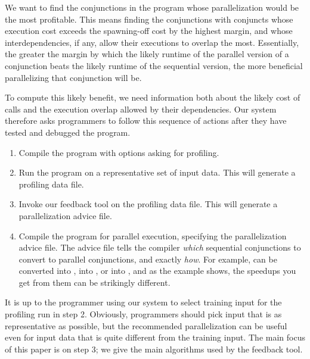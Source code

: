 We want to find the conjunctions in the program
whose parallelization would be the most profitable.
This means finding the conjunctions with conjuncts
whose execution cost exceeds the spawning-off cost by the highest margin,
and whose interdependencies, if any,
allow their executions to overlap the most.
Essentially, the greater the margin by which
the likely runtime of the parallel version of a conjunction beats
the likely runtime of the sequential version,
the more beneficial parallelizing that conjunction will be.

To compute this likely benefit,
we need information
both about the likely cost of calls
and the execution overlap allowed by their dependencies.
Our system therefore asks programmers
to follow this sequence of actions
after they have tested and debugged the program.

\begin{enumerate}
\item
Compile the program
with options asking for profiling.
\item
Run the program on a representative set of input data.
This will generate a profiling data file.
\item
Invoke our feedback tool on the profiling data file.
This will generate a parallelization advice file.
\item
Compile the program for parallel execution,
specifying the parallelization advice file.
The advice file tells the compiler
\emph{which} sequential conjunctions to convert to parallel conjunctions,
and exactly \emph{how}.
For example,  can be converted
into ,
into , or
into ,
and as the  example shows,
the speedups you get from them can be strikingly different.
\end{enumerate}

\noindent
It is up to the programmer using our system
to select training input for the profiling run in step 2.
Obviously, programmers should pick input that is as representative as possible,
but the recommended parallelization can be useful
even for input data that is quite different from the training input.
The main focus of this paper is on step 3;
we give the main algorithms used by the feedback tool.

